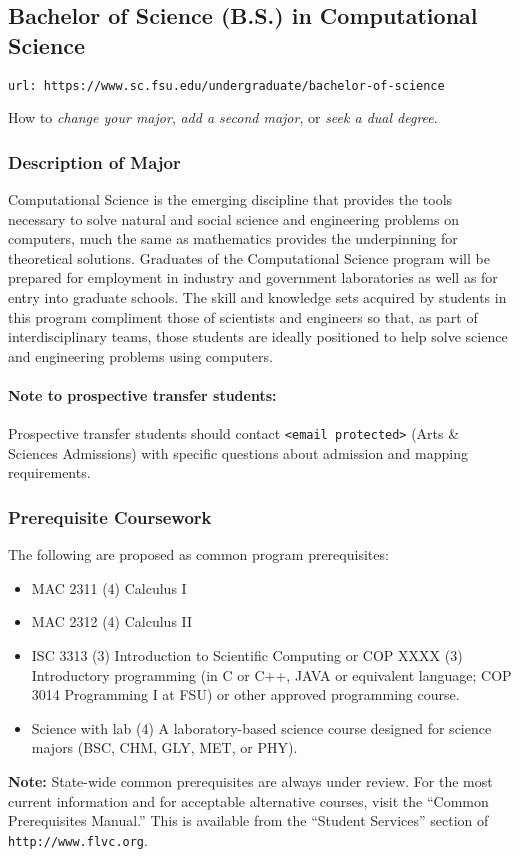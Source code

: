 \documentclass[12pt,a4paper]{article}
\begin{document}
\subsection{Bachelor of Science (B.S.) in Computational Science}
\texttt{url: https://www.sc.fsu.edu/undergraduate/bachelor-of-science}

How to \textit{change your major}, \textit{add a second major}, or \textit{seek a dual degree}.

\subsubsection*{Description of Major}
Computational Science is the emerging discipline that provides the tools necessary to solve natural and social science and engineering problems on computers, much the same as mathematics provides the underpinning for theoretical solutions. Graduates of the Computational Science program will be prepared for employment in industry and government laboratories as well as for entry into graduate schools. The skill and knowledge sets acquired by students in this program compliment those of scientists and engineers so that, as part of interdisciplinary teams, those students are ideally positioned to help solve science and engineering problems using computers.

\paragraph{Note to prospective transfer students:} Prospective transfer students should contact \texttt{<email protected>} (Arts \& Sciences Admissions) with specific questions about admission and mapping requirements.

\subsubsection*{Prerequisite Coursework}
The following are proposed as common program prerequisites:
\begin{itemize}
    \item MAC 2311 (4) Calculus I
    \item MAC 2312 (4) Calculus II
    \item ISC 3313 (3) Introduction to Scientific Computing or COP XXXX (3) Introductory programming (in C or C++, JAVA or equivalent language; COP 3014 Programming I at FSU) or other approved programming course.
    \item Science with lab (4) A laboratory-based science course designed for science majors (BSC, CHM, GLY, MET, or PHY).
\end{itemize}
\textbf{Note:} State-wide common prerequisites are always under review. For the most current information and for acceptable alternative courses, visit the “Common Prerequisites Manual.” This is available from the “Student Services” section of \texttt{http://www.flvc.org}.
\end{document}
